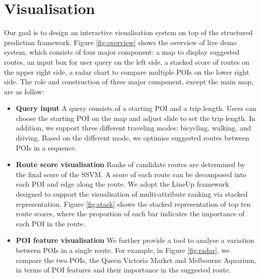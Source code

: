 \documentclass[sigconf]{acmart}
\begin{document}
\section{Visualisation}
Our goal is to design an interactive visualisation system on top of the structured prediction framework.
Figure \ref{fig:overview} shows the overview of live demo system, which consists of four major component: a map to display suggested routes, an input box for user query on the left side, a stacked score of routes on the upper right side, a radar chart to compare multiple  POIs on the lower right side. 
The role and construction of three major component, except the main map, are as follow:
\begin{itemize}
\item \textbf{Query input} A query consists of a starting POI and a trip length. 
Users can choose the starting POI on the map and adjust slide to set the trip length. 
In addition, we support three different traveling modes: bicycling, walking, and driving.
Based on the different mode, we optimise suggested routes between POIs in a sequence.
\item \textbf{Route score visualisation} Ranks of candidate routes are determined by the final score of the SSVM. 
A score of each route can be decomposed into each POI and edge along the route. 
We adopt the LineUp framework~\cite{gratzl2013lineup} designed to support the visualisation of multi-attribute ranking via stacked representation. 
Figure \ref{fig:stack} shows the stacked representation of top ten route scores, where the proportion of each bar indicates the importance of each POI in the route.
\item \textbf{POI feature visualisation} We further provide a tool to analyse a variation between POIs in a single route. 
For example, in Figure \ref{fig:radar}, we compare the two POIs, the Queen Victoria Market and Melbourne Aquarium, in terms of POI features and their importance in the suggested route. 
\end{itemize}
\end{document}
